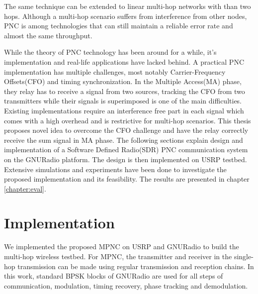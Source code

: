 The same technique can be extended to linear multi-hop networks with than two hops. Although a multi-hop scenario suffers from interference from other nodes, PNC is among technologies that can still maintain a reliable error rate and almost the same throughput.

While the theory of PNC technology has been around for a while, it's implementation and real-life applications have lacked behind. A practical PNC implementation has multiple challenges, most notably Carrier-Frequency Offsets(CFO) and timing synchronization. In the Multiple Access(MA) phase, they relay has to receive a signal from two sources, tracking the CFO from two transmitters while their signals is superimposed is one of the main difficulties. Existing implementations require an interference free part in each signal which comes with a high overhead and is restrictive for multi-hop scenarios. This thesis proposes novel idea to overcome the CFO challenge and have the relay correctly receive the sum signal in MA phase. The following sections explain design and implementation of a Software Defined Radio(SDR) PNC communication system on the GNURadio platform. The design is then implemented on USRP testbed. Extensive simulations and experiments have been done to investigate the proposed implementation and its feasibility. The results are presented in chapter \ref{chapter:eval}.

\section{Implementation}
We implemented the proposed MPNC on USRP and GNURadio to build the multi-hop wireless testbed.
For MPNC, the transmitter and receiver in the single-hop transmission can be made using regular transmission and reception chains. In this work, standard BPSK blocks of GNURadio are used for all steps of communication, modulation, timing recovery, phase tracking and demodulation.

